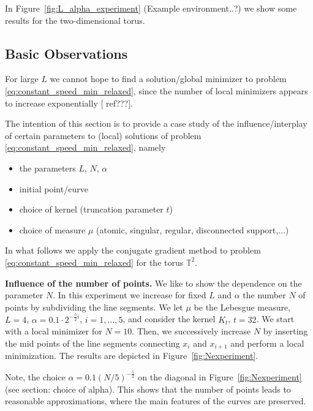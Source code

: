 \documentclass[draft,
a4paper,11pt,DIV=11,%
abstract=on%
]{scrartcl}
\begin{document}
In Figure~\ref{fig:L_alpha_experiment} {(\color{blue}Example environment..?)} we show some results for the two-dimensional torus. 



\subsection{Basic Observations}
For large $L$ we cannot hope to find a solution/global minimizer to problem \eqref{eq:constant_speed_min_relaxed}, since the number of local minimizers appears to increase exponentially {\color{blue}[ ref???]}.

The intention of this section is to provide a case study of the influence/interplay of certain parameters to (local) solutions of
problem \eqref{eq:constant_speed_min_relaxed}, namely
\begin{itemize}
\item the parameters $L$, $N$, $\alpha$
\item initial point/curve
\item choice of kernel (truncation parameter $t$)
\item choice of measure $\mu$ (atomic, singular, regular, disconnected support,...) 
\end{itemize}

In what follows we apply the conjugate gradient method to problem \eqref{eq:constant_speed_min_relaxed} for the torus $\mathbb T^{2}$.

\textbf{Influence of the number of points.} We like to show the dependence on the parameter $N$. In this experiment we increase for fixed $L$ and $\alpha$ the number $N$ of points by subdividing the line segments.  We let $\mu$ be the Lebesgue measure, $L=4$, $\alpha=0.1\cdot 2^{-\frac52 i}$, $i=1,\dots,5$, and consider the kernel $K_{t}$, $t=32$. We start with a local minimizer for $N=10$. Then, we successively increase $N$ by inserting the mid points of the line segments connecting $x_{i}$ and $x_{i+1}$ and perform a local minimization. The results are depicted in Figure~\ref{fig:Nexperiment}.

Note, the choice $\alpha =0.1 (N/5)^{-\frac 52}$ on the diagonal in  Figure~\ref{fig:Nexperiment} {\color{blue}(see section: choice of alpha)}. This shows that the number of points leads to reasonable approximations, where the main features of the curves are preserved.
\end{document}
